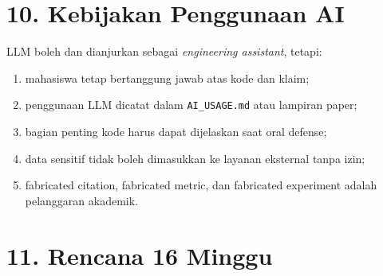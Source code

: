 \documentclass[
  indonesian,
  letterpaper,
  DIV=11,
  numbers=noendperiod]{scrreprt}
\providecommand{\tightlist}{%
  \setlength{\itemsep}{0pt}\setlength{\parskip}{0pt}}
\begin{document}

\chapter{10. Kebijakan Penggunaan AI}\label{kebijakan-penggunaan-ai}

LLM boleh dan dianjurkan sebagai \emph{engineering assistant}, tetapi:

\begin{enumerate}
\def\labelenumi{\arabic{enumi}.}
\tightlist
\item
  mahasiswa tetap bertanggung jawab atas kode dan klaim;
\item
  penggunaan LLM dicatat dalam \texttt{AI\_USAGE.md} atau lampiran
  paper;
\item
  bagian penting kode harus dapat dijelaskan saat oral defense;
\item
  data sensitif tidak boleh dimasukkan ke layanan eksternal tanpa izin;
\item
  fabricated citation, fabricated metric, dan fabricated experiment
  adalah pelanggaran akademik.
\end{enumerate}


\chapter{11. Rencana 16 Minggu}\label{rencana-16-minggu}
\end{document}

